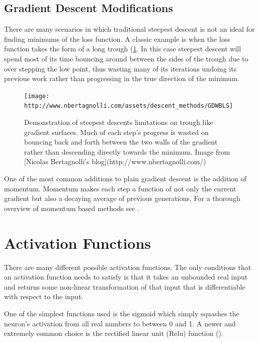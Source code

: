 \documentclass[]{book}
\theoremstyle{definition}
\theoremstyle{definition}
\theoremstyle{definition}
\theoremstyle{remark}
\begin{document}
\subsection{Gradient Descent
Modifications}\label{gradient-descent-modifications}

There are many scenarios in which traditional steepest descent is not an
ideal for finding minimums of the loss function. A classic example is
when the loss function takes the form of a long trough
(\ref{fig:badloss}. In this case steepest descent will spend most of its
time bouncing around between the sides of the trough due to over
stepping the low point, thus wasting many of its iterations undoing its
previous work rather than progressing in the true direction of the
minimum.

\begin{figure}

{\centering \texttt{[image: http://www.nbertagnolli.com/assets/descent\_methods/GDWBLS]} 

}

\caption{Demonstration of steepest descents limitations on trough like gradient surfaces. Much of each step's progress is wasted on bouncing back and forth between the two walls of the gradient rather than descending directly towards the minimum. Image from [Nicolas Bertagnolli's blog](http://www.nbertagnolli.com/)}\label{fig:badloss}
\end{figure}

One of the most common additions to plain gradient descent is the
addition of momentum. Momentum makes each step a function of not only
the current gradient but also a decaying average of previous
generations. For a thorough overview of momentum based methods see
\citet{momentum}.

\section{Activation Functions}\label{activation-functions}

There are many different possible activation functions. The only
conditions that an activation function needs to satisfy is that it takes
an unbounded real input and returns some non-linear transformation of
that input that is differentiable with respect to the input.

One of the simplest functions used is the sigmoid which simply squashes
the neuron's activation from all real numbers to between 0 and 1. A
newer and extremely common choice is the rectified linear unit (Relu)
function (\citet{relu_paper}).
\end{document}
